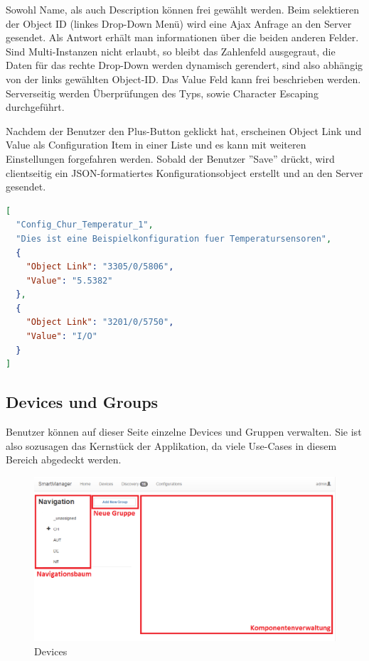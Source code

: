 Sowohl Name, als auch Description können frei gewählt werden. Beim selektieren der Object ID (linkes Drop-Down Menü) wird eine Ajax Anfrage an den Server gesendet. Als Antwort erhält man informationen über die beiden anderen Felder. Sind Multi-Instanzen nicht erlaubt, so bleibt das Zahlenfeld ausgegraut, die Daten für das rechte Drop-Down werden dynamisch gerendert, sind also abhängig von der links gewählten Object-ID. Das Value Feld kann frei beschrieben werden. Serverseitig werden Überprüfungen des Typs, sowie Character Escaping durchgeführt.

Nachdem der Benutzer den Plus-Button geklickt hat, erscheinen Object Link und Value als Configuration Item in einer Liste und es kann mit weiteren Einstellungen forgefahren werden. Sobald der Benutzer ''Save'' drückt, wird clientseitig ein JSON-formatiertes Konfigurationsobject erstellt und an den Server gesendet.

\begin{lstlisting}[language=json]
[
  "Config_Chur_Temperatur_1", 
  "Dies ist eine Beispielkonfiguration fuer Temperatursensoren", 
  {
	"Object Link": "3305/0/5806",
	"Value": "5.5382"
  }, 
  {
	"Object Link": "3201/0/5750",
	"Value": "I/O"
  }
]
\end{lstlisting}



\subsection{Devices und Groups}
Benutzer können auf dieser Seite einzelne Devices und Gruppen verwalten. Sie ist also sozusagen das Kernstück der Applikation, da viele Use-Cases in diesem Bereich abgedeckt werden.

\begin{figure}[H]
\centering
\includegraphics[scale=0.57]{../04_Realisierung/images/userinterface/devices_start.png}
\caption{Devices}
\end{figure}

